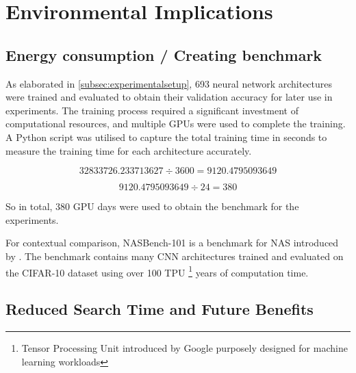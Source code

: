 \section{Environmental Implications}
\subsection{Energy consumption / Creating benchmark}

As elaborated in \cref{subsec:experimentalsetup}, 693 neural network architectures were trained and evaluated to obtain their validation accuracy for later use in experiments. The training process required a significant investment of computational resources, and multiple \glspl{GPU} were used to complete the training. A Python script was utilised to capture the total training time in seconds to measure the training time for each architecture accurately.

\begin{equation*} 32833726.233713627 \div 3600 = 9120.4795093649 \end{equation*}

\begin{equation*}
    9120.4795093649 \div 24 = 380
\end{equation*}

So in total, 380 \gls{GPU} days were used to obtain the benchmark for the experiments. 

For contextual comparison, NASBench-101 is a benchmark for \gls{NAS} introduced by \autocite{ying2019bench}. The benchmark contains many \gls{CNN} architectures trained and evaluated on the CIFAR-10 dataset using over 100 TPU \footnote{Tensor Processing Unit introduced by Google purposely designed for machine learning workloads} years of computation time. 

\subsection{Reduced Search Time and Future Benefits}

\begin{comment}
\begin{itemize}
    \item Discuss how this approach might reduce the time spent on neural architecture search
    \item Address the broader implications of such reductions, such as enabling more efficient research, reducing the overall environmental impact of the field, and making neural architecture search more accessible to researchers with limited resources.
\end{itemize}
\end{comment}

